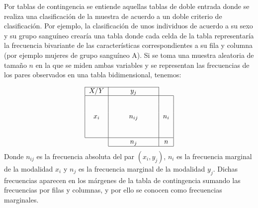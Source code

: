 Por tablas de contingencia se entiende aquellas tablas de doble
entrada donde se realiza una clasificación de la muestra de
acuerdo a un doble criterio de clasificación. Por ejemplo, la
clasificación de unos individuos de acuerdo a su sexo y su grupo
sanguíneo crearía una tabla donde cada celda de la tabla
representaría la frecuencia bivariante de las características
correspondientes a su fila y columna (por ejemplo mujeres de grupo
sanguíneo A). Si se toma una muestra aleatoria de tamaño $n$ en la
que se miden ambas variables y se representan las frecuencias de
los pares observados en una tabla bidimensional, tenemos:

\[
\begin{tabular}{|l|lllll|l|}
\cline{1-6}
$X/Y$ & \multicolumn{1}{c}{} & \multicolumn{1}{c}{} & \multicolumn{1}{c}{$y_j$} & \multicolumn{1}{c}{} & \multicolumn{1}{c|}{} & \multicolumn{1}{l}{} \\
\hline
\multicolumn{1}{|c|}{} & \multicolumn{1}{c}{} & \multicolumn{1}{c}{} & \multicolumn{1}{c}{} & \multicolumn{1}{c}{} & \multicolumn{1}{c|}{} & \multicolumn{1}{c|}{} \\
\multicolumn{1}{|c|}{} & \multicolumn{1}{c}{} & \multicolumn{1}{c}{} & \multicolumn{1}{c}{} & \multicolumn{1}{c}{} & \multicolumn{1}{c|}{} & \multicolumn{1}{c|}{} \\
\multicolumn{1}{|c|}{$x_i$} & \multicolumn{1}{c}{} & \multicolumn{1}{c}{} & \multicolumn{1}{c}{$n_{ij}$} & \multicolumn{1}{c}{} & \multicolumn{1}{c|}{} & \multicolumn{1}{c|}{$n_i$} \\
\multicolumn{1}{|c|}{} & \multicolumn{1}{c}{} & \multicolumn{1}{c}{} & \multicolumn{1}{c}{} & \multicolumn{1}{c}{} & \multicolumn{1}{c|}{} & \multicolumn{1}{c|}{} \\
\multicolumn{1}{|c|}{} & \multicolumn{1}{c}{} & \multicolumn{1}{c}{} & \multicolumn{1}{c}{} & \multicolumn{1}{c}{} & \multicolumn{1}{c|}{} & \multicolumn{1}{c|}{} \\
\hline
\multicolumn{1}{c|}{} & \multicolumn{1}{c}{} & \multicolumn{1}{c}{} & \multicolumn{1}{c}{$n_j$} & \multicolumn{1}{c}{} & \multicolumn{1}{c|}{} & \multicolumn{1}{c|}{$n$} \\
\cline{2-7}
\end{tabular}
\]
Donde $n_{ij}$ es la frecuencia absoluta del par $(x_i, y_j)$,
$n_i$ es la frecuencia marginal de la modalidad $x_i$ y $n_j$ es
la frecuencia marginal de la modalidad $y_j$. Dichas frecuencias
aparecen en los márgenes de la tabla de contingencia sumando las
frecuencias por filas y columnas, y por ello se conocen como
frecuencias marginales.

